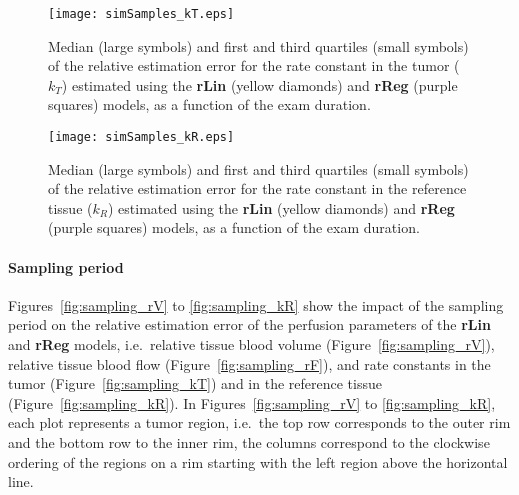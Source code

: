 \begin{figure}
\texttt{[image: simSamples\_kT.eps]}
\caption{Median (large symbols) and first and third quartiles (small symbols) of the relative estimation error for the rate constant in the tumor ($k_T$) estimated using the \textbf{rLin} (yellow diamonds) and \textbf{rReg} (purple squares) models, as a function of the exam duration.}
\label{fig:examDuration_kT}
\end{figure}

\begin{figure}
\texttt{[image: simSamples\_kR.eps]}
\caption{Median (large symbols) and first and third quartiles (small symbols) of the relative estimation error for the rate constant in the reference tissue ($k_R$) estimated using the \textbf{rLin} (yellow diamonds) and \textbf{rReg} (purple squares) models, as a function of the exam duration.}
\label{fig:examDuration_kR}
\end{figure}


\paragraph{Sampling period}
Figures~\ref{fig:sampling_rV} to \ref{fig:sampling_kR} show the impact of the sampling period on the relative estimation error of the perfusion parameters of the \textbf{rLin} and \textbf{rReg} models, i.e.~relative tissue blood volume (Figure~\ref{fig:sampling_rV}), relative tissue blood flow (Figure~\ref{fig:sampling_rF}), and rate constants in the tumor (Figure~\ref{fig:sampling_kT}) and in the reference tissue (Figure~\ref{fig:sampling_kR}).
In Figures~\ref{fig:sampling_rV} to \ref{fig:sampling_kR}, each plot represents a tumor region, i.e.~the top row corresponds to the outer rim and the bottom row to the inner rim, the columns correspond to the clockwise ordering of the regions on a rim starting with the left region above the horizontal line.

